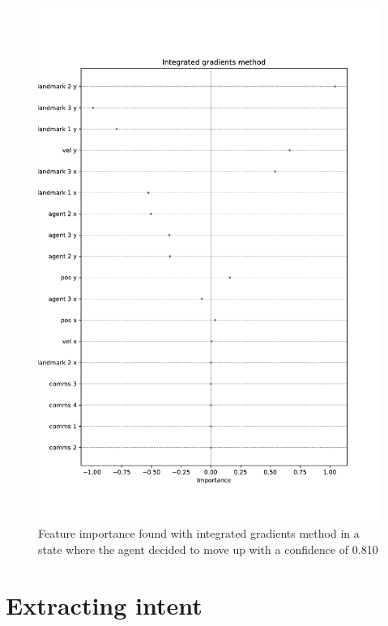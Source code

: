 \documentclass[UKenglish]{uiomasterthesis}
\begin{document}
\begin{figure}[!ht]
	\includegraphics[width=\columnwidth]{images/intgrad_move_up.pdf}
	\caption{Feature importance found with integrated gradients method in a state where the agent decided to move up with a confidence of 0.810}
	\label{fig:intgrad} 
\end{figure}

\section{Extracting intent}
\end{document}
